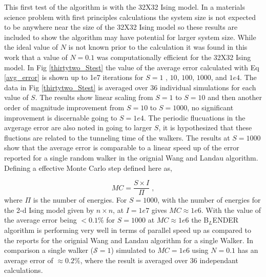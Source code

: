 \documentclass[aps,prl,reprint,superscriptaddress,showkeys]{revtex4-1}
\begin{document}
This first test of the algorithm is with the 32X32 Ising model. In a materials science problem with first principles calculations the system size is not expected to be anywhere near the size of the  32X32 Ising model so these results are included to show the algorithm may have potential for larger system size. While the ideal value of $N$ is not known prior to the calculation it was found in this work that a value of $N=0.1$ was computationally efficient for the 32X32 Ising model. In Fig \ref{thirtytwo_Stest} the value of the average error calculated with Eq \ref{avg_error} is shown up to 1e7 iterations for $S=1$ , $10$, $100$, $1000$, and $1e4$. The data in Fig \ref{thirtytwo_Stest} is averaged over 36 individual simulations for each value of $S$. The results show linear scaling from $S=1$ to $S=10$ and then another order of magnitude improvement from $S=10$ to $S=1000$, no significant improvement is discernable going to $S=1e4$.  The periodic flucuations in the avgerage error are also noted in going to larger $S$, it is hypothesized that these fluctions are related to the tunneling time of the walkers. The results at $S=1000$ show that the average error is comparable to a linear speed up of the error reported for a single random walker in the orignial Wang and Landau algorithm. Defining a effective Monte Carlo step defined here as,

\begin{equation}
MC = \frac{S\times I}{\Pi} \;,
\label{mcstep}
\end{equation} 
where $\Pi$ is the number of energies.  For $S=1000$, with the number of energies for the 2-d Ising model given by $n\times n$, at $I=1e7$ gives $MC \approx 1e6$. With the value of the average error being $<0.1\%$ for $S=1000$ at $MC\approx 1e6$ the B$_L$ENDER algorithm is performing very well in terms of parallel speed up as compared to the reports for the orignial Wang and Landau algorithm for a single Walker\cite{WL_phys_rev_lett}.  In comparison a single walker ($\mathcal{S}=1$) simulated to $MC = 1e6$ using $N=0.1$ has an average error of $\approx 0.2\%$, where the result is averaged over 36 independant calculations.
\end{document}
